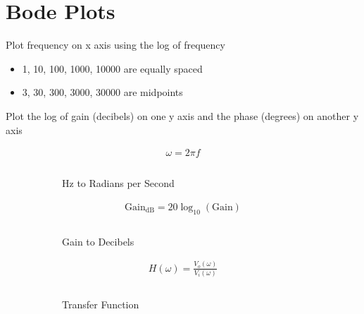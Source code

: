 \documentclass[oneside]{book}
\begin{document}
            \section{Bode Plots}
                Plot frequency on x axis using the log of frequency
                \begin{itemize}
                    \item 1, 10, 100, 1000, 10000 are equally spaced
                    \item 3, 30, 300, 3000, 30000 are midpoints
                \end{itemize}
                Plot the log of gain (decibels) on one y axis and the phase (degrees) on another y axis
                \begin{figure}[H]
                    \centering
                    \begin{subfigure}{0.22\linewidth}
                        \centering
                        \begin{align*}
                            \omega = 2\pi f\\\\
                        \end{align*}
                        \caption{Hz to Radians per Second}
                    \end{subfigure}
                    \begin{subfigure}{0.22\linewidth}
                        \centering
                        \begin{align*}
                            \text{Gain}_{\text{dB}} = 20\log_{10}\left(\text{Gain}\right)\\\\
                        \end{align*}
                        \caption{Gain to Decibels}
                    \end{subfigure}
                    \begin{subfigure}{0.22\linewidth}
                        \centering
                        \begin{align*}
                            H(\omega) = \frac{V_o(\omega)}{V_i(\omega)}\\\\
                        \end{align*}
                        \caption{Transfer Function}
                    \end{subfigure}
                    \begin{subfigure}{0.22\linewidth}

\end{subfigure}
\end{figure}
\end{document}

